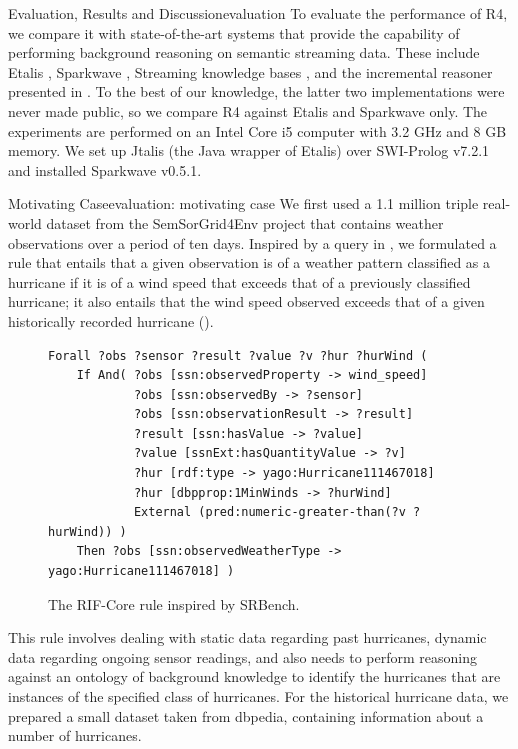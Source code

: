 \begin{nestedsection}{Evaluation, Results and Discussion}{evaluation}
	To evaluate the performance of R4, we compare it with state-of-the-art systems that provide the capability of performing background reasoning on semantic streaming data.
	These include Etalis \citep{EP-SPARQL}, Sparkwave \citep{sparkwave}, Streaming knowledge bases \citep{walavalkar08streamingkb}, and the incremental reasoner presented in \citep{inc-reasoning-background-knowledge}.
	To the best of our knowledge, the latter two implementations were never made public, so we compare R4 against Etalis and Sparkwave only.
	The experiments are performed on an Intel Core i5 computer with 3.2 GHz and 8 GB memory.
	We set up Jtalis (the Java wrapper of Etalis) over SWI-Prolog v7.2.1 and installed Sparkwave v0.5.1.

	\begin{nestedsection}{Motivating Case}{evaluation: motivating case}
		We first used a 1.1 million triple real-world dataset from the SemSorGrid4Env project that contains weather observations over a period of ten days.
		Inspired by a query in \citep{SRBench}, we formulated a rule that entails that a given observation is of a weather pattern classified as a hurricane if it is of a wind speed that exceeds that of a previously classified hurricane;
		it also entails that the wind speed observed exceeds that of a given historically recorded hurricane ().
		\begin{figure}
			\centering
			\begin{verbatim}
Forall ?obs ?sensor ?result ?value ?v ?hur ?hurWind (
    If And( ?obs [ssn:observedProperty -> wind_speed]
    		?obs [ssn:observedBy -> ?sensor]
            ?obs [ssn:observationResult -> ?result] 
            ?result [ssn:hasValue -> ?value]
            ?value [ssnExt:hasQuantityValue -> ?v]
            ?hur [rdf:type -> yago:Hurricane111467018]
            ?hur [dbpprop:1MinWinds -> ?hurWind] 
            External (pred:numeric-greater-than(?v ?hurWind)) )
    Then ?obs [ssn:observedWeatherType -> yago:Hurricane111467018] )
			\end{verbatim}
			\caption{The RIF-Core rule inspired by SRBench.}
		\end{figure}
		This rule involves dealing with static data regarding past hurricanes, dynamic data regarding ongoing sensor readings, and also needs to perform reasoning against an ontology of background knowledge to identify the hurricanes that are instances of the specified class of hurricanes.
		For the historical hurricane data, we prepared a small dataset taken from dbpedia, containing information about a number of hurricanes.


\end{nestedsection}
\end{nestedsection}
